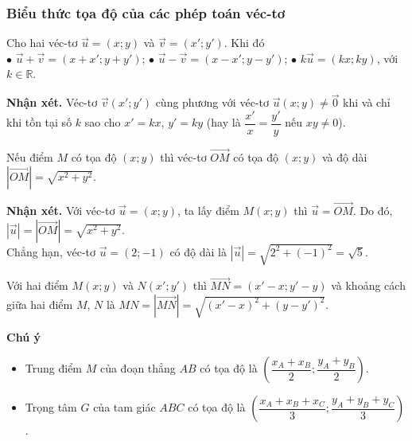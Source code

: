 \subsubsection{Biểu thức tọa độ của các phép toán véc-tơ}
	\begin{dl}
		Cho hai véc-tơ $\vec{u}=(x;y)$ và $\vec{v}=(x';y')$. Khi đó\\
		$\bullet$ $\vec{u}+\vec{v}=(x+x';y+y')$; \quad $\bullet$ $\vec{u}-\vec{v}=(x-x';y-y')$; \quad $\bullet$ $k\vec{u}=(kx;ky)$, với $k\in\mathbb{R}$.
	\end{dl}
\textbf{Nhận xét.} Véc-tơ $\vec{v}(x';y')$ cùng phương với véc-tơ $\vec{u}(x;y)\neq \vec{0}$ khi và chỉ khi tồn tại số $k$ sao cho $x'=kx$, $y'=ky$ (hay là $\dfrac{x'}{x}=\dfrac{y'}{y}$ nếu $xy\neq 0$).
\begin{dl}
Nếu điểm $M$ có tọa độ $(x;y)$ thì véc-tơ $\overrightarrow{OM}$ có tọa độ $(x;y)$ và độ dài $\left|\overrightarrow{OM}\right|=\sqrt{x^2+y^2}$.
\end{dl}
\textbf{Nhận xét.} Với véc-tơ $\vec{u}=(x;y)$, ta lấy điểm $M(x;y)$ thì $\vec{u}=\overrightarrow{OM}$. Do đó, $\left|\vec{u}\right|=\left|\overrightarrow{OM}\right|=\sqrt{x^2+y^2}$.\\
Chẳng hạn, véc-tơ $\vec{u}=(2;-1)$ có độ dài là $\left|\vec{u}\right|=\sqrt{2^2+(-1)^2}=\sqrt{5}$.
\begin{dl}
Với hai điểm $M(x;y)$ và $N(x';y')$ thì $\overrightarrow{MN}=(x'-x;y'-y)$ và khoảng cách giữa hai điểm $M$, $N$ là $MN=\left|\overrightarrow{MN}\right|=\sqrt{(x'-x)^2+(y-y')^2}$.
\end{dl}
\textbf{Chú ý}
\begin{itemize}
\item Trung điểm $M$ của đoạn thẳng $AB$ có tọa độ là $\left(\dfrac{x_A+x_B}{2};\dfrac{y_A+y_B}{2}\right)$.
\item Trọng tâm $G$ của tam giác $ABC$ có tọa độ là $\left(\dfrac{x_A+x_B+x_C}{3};\dfrac{y_A+y_B+y_C}{3}\right)$.
\end{itemize}
